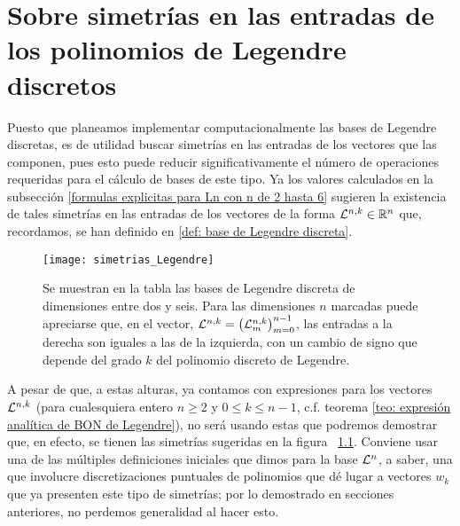 \chapter{ Sobre simetrías en las entradas de los polinomios de Legendre discretos}
\label{section: sobre simetrias en las entradas de los poliomios discretos de Legendre}
Puesto que planeamos implementar computacionalmente
las bases de Legendre discretas, es de utilidad 
buscar simetrías en las entradas de los vectores que las 
componen, pues esto puede reducir significativamente
el número de operaciones requeridas para el cálculo 
de bases de este tipo.
Ya los valores calculados
en la subsección 
\ref{formulas explicitas para Ln con n de 2 hasta 6}
sugieren 
la existencia de tales simetrías en las entradas 
de los vectores de la forma $\mathcal{L}^{n,k} \in \mathbb{R}^{n}$
que, recordamos, se han definido en 
\ref{def: base de Legendre discreta}.


\begin{figure}[H] \label{fig: simetrias entradas Legendre}
\centering\captionsetup{format = hang}
	\begin{measuredfigure}
		\texttt{[image: simetrias\_Legendre]} 
		\caption{ 
		Se muestran en la tabla las bases de Legendre
		discreta de dimensiones entre dos y seis. 		
		Para las dimensiones $n$ marcadas
		puede apreciarse que, en el vector,
		 $\mathcal{L}^{n,k} = \left( \mathcal{L}^{n,k}_{m} \right)_{m=0}^{n-1}$,
		las entradas a la derecha son iguales a las de la izquierda,
		con un cambio de signo que depende del
		grado $k$ del polinomio discreto de Legendre.}
		\label{fig: simetrias entradas Legendre}
 	\end{measuredfigure} 
 \end{figure}

A pesar de que, a estas alturas, ya contamos
con expresiones para los vectores $\mathcal{L}^{n,k}$
(para cualesquiera entero $n \geq 2$ y $0 \leq k \leq n-1$,
c.f. teorema \ref{teo: expresión analítica de BON de Legendre}),
no será usando estas que podremos demostrar que, en efecto,
se tienen las simetrías sugeridas en la figura
~\ref{fig: simetrias entradas Legendre}.
Conviene
usar una de las múltiples definiciones iniciales
que dimos para la base $\mathcal{L}^{n}$, a saber, una
que involucre discretizaciones puntuales de polinomios 
que dé lugar a vectores $w_{k}$ que ya presenten 
este tipo de simetrías; por lo demostrado en secciones anteriores,
no perdemos generalidad al hacer esto. 


